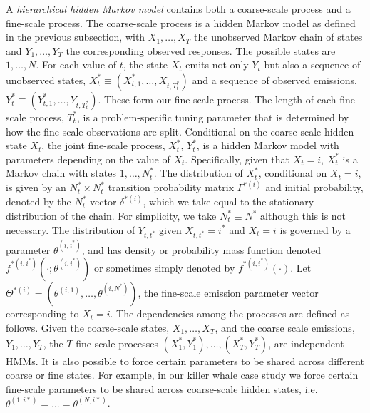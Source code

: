 A \textit{hierarchical hidden Markov model} contains both a coarse-scale process and a fine-scale process. The coarse-scale process is a hidden Markov model as defined in the previous subsection, with $X_1, \ldots, X_T$ the unobserved Markov chain of states and $Y_1,\ldots, Y_T$ the corresponding observed responses. The possible states are $1,\ldots, N$.   
%
For each value of $t$, the state $X_t$ emits not only $Y_t$ but also a sequence of unobserved states, $X_t^* \equiv (X_{t,1}^*,\ldots, X_{t,T_t^*})$ and a sequence of observed emissions, $Y_t^* \equiv (Y_{t,1}^*,\ldots, Y_{t,T_t^*})$. These form our fine-scale process. The length of each fine-scale process, $T^*_t$, is a problem-specific tuning parameter that is determined by how the fine-scale observations are split. Conditional on the coarse-scale hidden state $X_t$, the joint fine-scale process, $X_t^*$, $Y_t^*$, is a hidden Markov model with parameters depending on the value of $X_t$.  Specifically, given that $X_t=i$, $X_t^*$ is a Markov chain with states $1,\ldots, N_t^*$. The distribution of $X_t^*$, conditional on $X_t=i$, is given by an $N^*_t \times N^*_t$ transition probability matrix $\Gamma^{*(i)}$ and initial probability, denoted by the $N_t^*$-vector $\delta^{*(i)}$, which we take equal to the stationary distribution of the chain. For simplicity, we take $N_t^* \equiv N^*$ although this is not necessary.
%
The distribution of $Y_{t, t^*}$ given $X_{t, t^*}=i^*$ and $X_t=i$ is governed by a parameter $\theta^{(i,i^*)}$, and has density or probability mass function denoted $f^{*(i,i^*)}\left(\cdot; \theta^{(i,i^*)}\right)$ or sometimes simply denoted by $f^{*(i,i^*)}(\cdot)$. Let $\Theta^{*(i)}=\left(\theta^{(i,1)}, \ldots, \theta^{(i,N^*)}\right)$, the fine-scale emission parameter vector corresponding to $X_t=i$.
%
The dependencies among the processes are defined as follows.
%
Given the coarse-scale states, $X_1,\ldots, X_T$, and the coarse scale emissions,  
$Y_1,\ldots, Y_T$, the $T$ fine-scale processes $(X_1^*, Y_1^*), \ldots, (X_T^*, Y_T^*)$, are independent HMMs. It is also possible to force certain parameters to be shared across different coarse or fine states. For example, in our killer whale case study we force certain fine-scale parameters to be shared across coarse-scale hidden states, i.e. $\theta^{(1,i*)} = \ldots = \theta^{(N,i*)}$.

